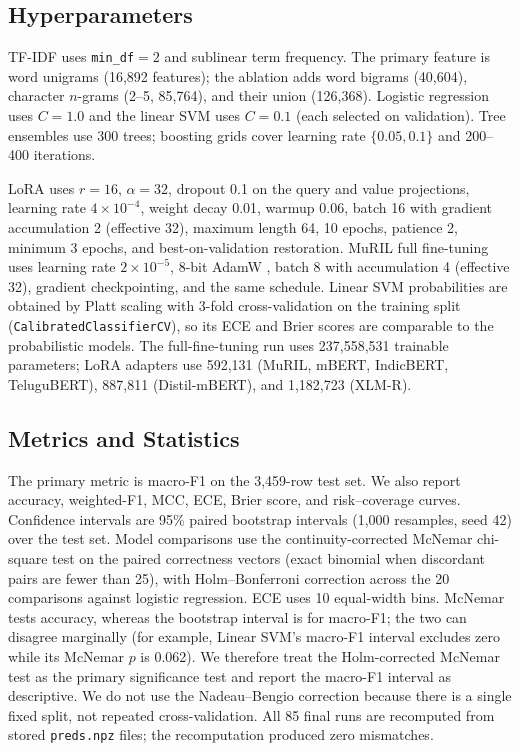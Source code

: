 \documentclass[10pt,journal]{IEEEtran}
\begin{document}
\subsection{Hyperparameters}
TF-IDF uses \texttt{min\_df}$=2$ and sublinear term frequency. The primary feature is word unigrams (16{,}892 features); the ablation adds word bigrams (40{,}604), character $n$-grams (2--5, 85{,}764), and their union (126{,}368). Logistic regression uses $C=1.0$ and the linear SVM uses $C=0.1$ (each selected on validation). Tree ensembles use 300 trees; boosting grids cover learning rate $\{0.05,0.1\}$ and 200--400 iterations.

LoRA uses $r=16$, $\alpha=32$, dropout 0.1 on the query and value projections, learning rate $4\times10^{-4}$, weight decay 0.01, warmup 0.06, batch 16 with gradient accumulation 2 (effective 32), maximum length 64, 10 epochs, patience 2, minimum 3 epochs, and best-on-validation restoration. MuRIL full fine-tuning uses learning rate $2\times10^{-5}$, 8-bit AdamW \cite{dettmers2023}, batch 8 with accumulation 4 (effective 32), gradient checkpointing, and the same schedule. Linear SVM probabilities are obtained by Platt scaling with 3-fold cross-validation on the training split (\texttt{CalibratedClassifierCV}), so its ECE and Brier scores are comparable to the probabilistic models. The full-fine-tuning run uses 237{,}558{,}531 trainable parameters; LoRA adapters use 592{,}131 (MuRIL, mBERT, IndicBERT, TeluguBERT), 887{,}811 (Distil-mBERT), and 1{,}182{,}723 (XLM-R).

\subsection{Metrics and Statistics}
The primary metric is macro-F1 on the 3{,}459-row test set. We also report accuracy, weighted-F1, MCC, ECE, Brier score, and risk--coverage curves. Confidence intervals are 95\% paired bootstrap intervals (1{,}000 resamples, seed 42) over the test set. Model comparisons use the continuity-corrected McNemar chi-square test on the paired correctness vectors (exact binomial when discordant pairs are fewer than 25), with Holm--Bonferroni correction across the 20 comparisons against logistic regression. ECE uses 10 equal-width bins. McNemar tests accuracy, whereas the bootstrap interval is for macro-F1; the two can disagree marginally (for example, Linear SVM's macro-F1 interval excludes zero while its McNemar $p$ is 0.062). We therefore treat the Holm-corrected McNemar test as the primary significance test and report the macro-F1 interval as descriptive. We do not use the Nadeau--Bengio correction because there is a single fixed split, not repeated cross-validation. All 85 final runs are recomputed from stored \texttt{preds.npz} files; the recomputation produced zero mismatches.
\end{document}

